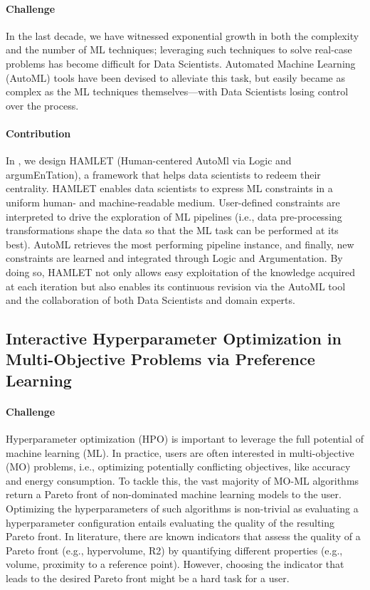 \paragraph{Challenge} In the last decade, we have witnessed exponential growth in both the complexity and the number of ML techniques; leveraging such techniques to solve real-case problems has become difficult for Data Scientists.
Automated Machine Learning (AutoML) tools have been devised to alleviate this task, but easily became as complex as the ML techniques themselves---with Data Scientists losing control over the process.

\paragraph{Contribution} In , we design HAMLET (Human-centered AutoMl via Logic and argumEnTation), a framework that helps data scientists to redeem their centrality.
HAMLET enables data scientists to express ML constraints in a uniform human- and machine-readable medium.
User-defined constraints are interpreted to drive the exploration of ML pipelines (i.e., data pre-processing transformations shape the data so that the ML task can be performed at its best).
AutoML retrieves the most performing pipeline instance, and finally, new constraints are learned and integrated through Logic and Argumentation.
By doing so, HAMLET not only allows easy exploitation of the knowledge acquired at each iteration but also enables its continuous revision via the AutoML tool and the collaboration of both Data Scientists and domain experts.


\subsection*{Interactive Hyperparameter Optimization in Multi-Objective Problems via Preference Learning}


\paragraph{Challenge} Hyperparameter optimization (HPO) is important to leverage the full potential of machine learning (ML).
In practice, users are often interested in multi-objective (MO) problems, i.e., optimizing potentially conflicting objectives, like accuracy and energy consumption.
To tackle this, the vast majority of MO-ML algorithms return a Pareto front of non-dominated machine learning models to the user.
Optimizing the hyperparameters of such algorithms is non-trivial as evaluating a hyperparameter configuration entails evaluating the quality of the resulting Pareto front.
In literature, there are known indicators that assess the quality of a Pareto front (e.g., hypervolume, R2) by quantifying different properties (e.g., volume, proximity to a reference point).
However, choosing the indicator that leads to the desired Pareto front might be a hard task for a user.

